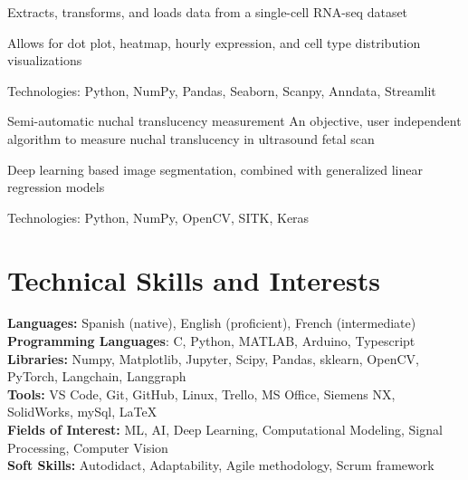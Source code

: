\documentclass{resume}
\begin{document}
    \resumeItemListStart
    \item {Extracts, transforms, and loads data from a single-cell RNA-seq dataset}
    \item {Allows for dot plot, heatmap, hourly expression, and cell type distribution visualizations}
    \item {Technologies: Python, NumPy, Pandas, Seaborn, Scanpy, Anndata, Streamlit}
    \resumeItemListEnd

    \resumeProject
    {Semi-automatic nuchal translucency measurement} %
    {An objective, user independent algorithm to measure nuchal translucency in ultrasound fetal scan}
    {} %

    \resumeItemListStart
    \item {Deep learning based image segmentation, combined with generalized linear regression models}
    \item {Technologies: Python, NumPy, OpenCV, SITK, Keras}
    \resumeItemListEnd

    \resumeSubHeadingListEnd


    \vspace{-5mm}


    \section{\textbf{Technical Skills and Interests}} \label{sec:skills}
    \begin{itemize}[leftmargin=0.05in, label={}]
        \small{\item{
            \textbf{Languages:}{ Spanish (native), English (proficient), French (intermediate) } \\
            \textbf{Programming Languages}{: C, Python, MATLAB, Arduino, Typescript } \\
            \textbf{Libraries:}{ Numpy, Matplotlib, Jupyter, Scipy, Pandas, sklearn, OpenCV, PyTorch, Langchain, Langgraph}\\
            \textbf{Tools:}{ VS Code, Git, GitHub, Linux, Trello, MS Office, Siemens NX, SolidWorks, mySql,
                \LaTeX} \\
            \textbf{Fields of Interest:}
            {ML, AI, Deep Learning, Computational Modeling, Signal Processing, Computer Vision} \\
            \textbf{Soft Skills:}{ Autodidact, Adaptability, Agile methodology, Scrum framework} \\
        }}
    \end{itemize}
\end{document}

